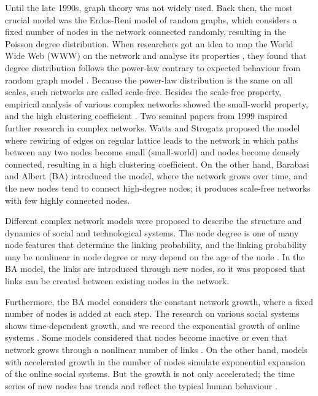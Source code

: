 Until the late 1990s, graph theory was not widely used. Back then, the most crucial model was the Erdos-Reni model of random graphs, which considers a fixed number of nodes in the network connected randomly, resulting in the Poisson degree distribution. When researchers got an idea to map the World Wide Web (WWW) on the network and analyse its properties \cite{huberman1999}, they found that degree distribution follows the power-law contrary to expected behaviour from random graph model \cite{dorogovtsev2010complex}. Because the power-law distribution is the same on all scales, such networks are called scale-free. Besides the scale-free property, empirical analysis of various complex networks showed the small-world property, and the high clustering coefficient \cite{barabasi2009,newman2010}. Two seminal papers from 1999 inspired further research in complex networks. Watts and Strogatz \cite{watts1998collective} proposed the model where rewiring of edges on regular lattice leads to the network in which paths between any two nodes become small (small-world) and nodes become densely connected, resulting in a high clustering coefficient. On the other hand, Barabasi and Albert (BA) \cite{barabasi1999} introduced the model, where the network grows over time, and the new nodes tend to connect high-degree nodes; it produces scale-free networks with few highly connected nodes. 

Different complex network models were proposed to describe the structure and dynamics of social and technological systems. The node degree is one of many node features that determine the linking probability, and the linking probability may be nonlinear in node degree or may depend on the age of the node \cite{dorogovtsev2000b, dorogovtsev2001b}. In the BA model, the links are introduced through new nodes, so it was proposed that links can be created between existing nodes in the network.  

Furthermore, the BA model considers the constant network growth, where a fixed number of nodes is added at each step. The research on various social systems shows time-dependent growth, and we record the exponential growth of online systems \cite{liu2019}. Some models considered that nodes become inactive or even that network grows through a nonlinear number of links \cite{pham2016}. On the other hand, models with accelerated growth in the number of nodes \cite{sen2004} simulate exponential expansion of the online social systems. But the growth is not only accelerated; the time series of new nodes has trends and reflect the typical human behaviour \cite{mitrovic2010a, mitrovic2012,mitrovic2015}.

